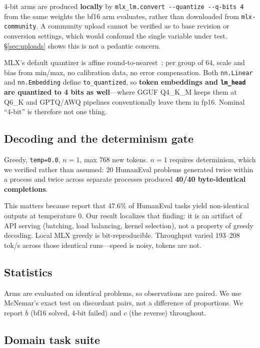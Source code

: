 \documentclass[11pt]{article}
\begin{document}
4-bit arms are produced \textbf{locally} by
\texttt{mlx\_lm.convert -{}-quantize -{}-q-bits 4} from the same weights the bf16 arm
evaluates, rather than downloaded from \texttt{mlx-community}. A community upload cannot
be verified as to base revision or conversion settings, which would confound the single
variable under test. \S\ref{sec:uploads} shows this is not a pedantic concern.

MLX's default quantizer is affine round-to-nearest~\citep{applequantize}: per group of
64, scale and bias from min/max, no calibration data, no error compensation. Both
\texttt{nn.Linear} and \texttt{nn.Embedding} define \texttt{to\_quantized}, so
\textbf{token embeddings and \texttt{lm\_head} are quantized to 4 bits as
well}---where GGUF Q4\_K\_M keeps them at Q6\_K and GPTQ/AWQ pipelines conventionally
leave them in fp16. Nominal ``4-bit'' is therefore not one thing.

\subsection{Decoding and the determinism gate}
\label{sec:determinism}

Greedy, \texttt{temp=0.0}, $n=1$, max 768 new tokens. $n=1$ requires determinism, which
we verified rather than assumed: 20 HumanEval problems generated twice within a process
and twice across separate processes produced \textbf{40/40 byte-identical completions}.

This matters because \citet{ouyang2025nondeterminism} report that 47.6\% of HumanEval
tasks yield non-identical outputs at temperature 0. Our result localizes that finding: it
is an artifact of API serving (batching, load balancing, kernel selection), not a
property of greedy decoding. Local MLX greedy is bit-reproducible. Throughput varied
193--208 tok/s across those identical runs---speed is noisy, tokens are not.

\subsection{Statistics}

Arms are evaluated on identical problems, so observations are paired. We use McNemar's
exact test on discordant pairs, not a difference of proportions. We report $b$ (bf16
solved, 4-bit failed) and $c$ (the reverse) throughout.

\subsection{Domain task suite}
\label{sec:domainsuite}
\end{document}

